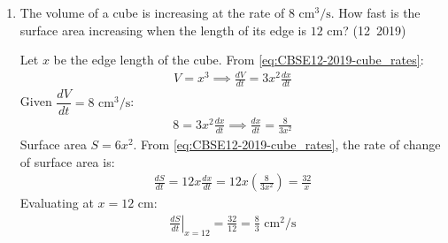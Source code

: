 \begin{enumerate}[label=\thesubsection.\arabic*, ref=\thesubsection.\theenumi]
\solution
Taking the natural logarithm on both sides:
\begin{align}
	\ln\brak{a + bx} + \frac{y}{x} = \ln x \implies \frac{y}{x} = \ln x - \ln\brak{a + bx}
\end{align}
Differentiating with respect to $x$:
\begin{align}
	\frac{x\frac{dy}{dx} - y}{x^2} = \frac{1}{x} - \frac{b}{a + bx} = \frac{a + bx - bx}{x\brak{a + bx}} = \frac{a}{x\brak{a + bx}}
\end{align}
Multiplying by $x^2$:
\begin{align}
	x\frac{dy}{dx} - y = \frac{ax}{a + bx} \label{eq:EE26BTECH11223-12-q28-rel1}
\end{align}
Differentiating \eqref{eq:EE26BTECH11223-12-q28-rel1} with respect to $x$:
\begin{align}
	\frac{dy}{dx} + x\frac{d^2y}{dx^2} - \frac{dy}{dx} &= \frac{\brak{a + bx}\brak{a} - \brak{ax}\brak{b}}{\brak{a + bx}^2} \\
	x\frac{d^2y}{dx^2} &= \frac{a^2}{\brak{a + bx}^2}
\end{align}
Multiplying both sides by $x^2$:
\begin{align}
	x^3\frac{d^2y}{dx^2} = \frac{a^2 x^2}{\brak{a + bx}^2} = \left(\frac{ax}{a + bx}\right)^2
\end{align}
Substituting \eqref{eq:EE26BTECH11223-12-q28-rel1}:
\begin{align}
	x^3\frac{d^2y}{dx^2} = \left(x\frac{dy}{dx} - y\right)^2
\end{align}
The following code verifies the differential identity:
\begin{lstlisting}[frame=single, basicstyle=\ttfamily\small]
	codes/q28.py
\end{lstlisting}

\item The volume of a cube is increasing at the rate of $8\text{ cm}^3/\text{s}$. How fast is the surface area increasing when the length of its edge is $12\text{ cm}$?
\hfill (12~2019)

\solution
Let $x$ be the edge length of the cube. From \eqref{eq:CBSE12-2019-cube_rates}:
\begin{align}
	V = x^3 \implies \frac{dV}{dt} = 3x^2 \frac{dx}{dt}
\end{align}
Given $\dfrac{dV}{dt} = 8\text{ cm}^3/\text{s}$:
\begin{align}
	8 = 3x^2 \frac{dx}{dt} \implies \frac{dx}{dt} = \frac{8}{3x^2}
\end{align}
Surface area $S = 6x^2$. From \eqref{eq:CBSE12-2019-cube_rates}, the rate of change of surface area is:
\begin{align}
	\frac{dS}{dt} = 12x \frac{dx}{dt} = 12x \left(\frac{8}{3x^2}\right) = \frac{32}{x}
\end{align}
Evaluating at $x = 12\text{ cm}$:
\begin{align}
	\left.\frac{dS}{dt}\right|_{x=12} = \frac{32}{12} = \frac{8}{3}\text{ cm}^2/\text{s}
\end{align}



\end{enumerate}
